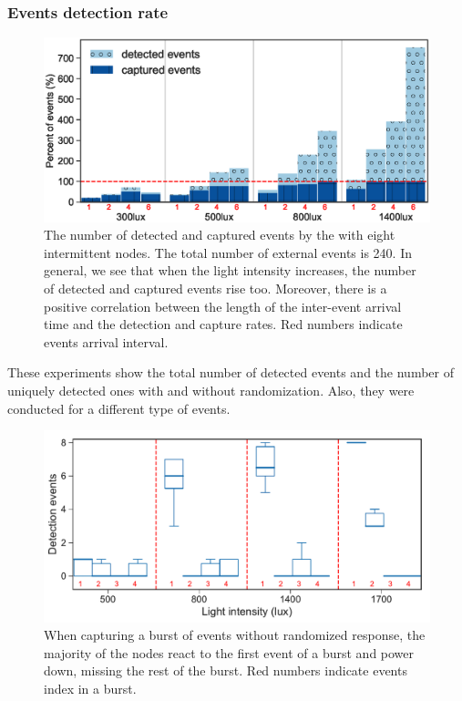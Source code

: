 \subsubsection{Events detection rate}
%
\begin{figure}[t]
		\centering
	    \includegraphics[width=\columnwidth]{figures/regular_events_capture_rate.eps}
		\caption{The number of detected and captured events by the \fullcim with eight intermittent nodes. The total number of external events is 240. In general, we see that when the light intensity increases, the number of detected and captured events rise too. Moreover, there is a positive correlation between the length of the inter-event arrival time and the detection and capture rates. Red numbers indicate events arrival interval.}
    	\label{fig:events_detection_rate}
\end{figure} 
These experiments show the total number of detected events and the number of uniquely detected ones with and without randomization. Also, they were conducted for a different type of events. 
%
\begin{figure}[t]
    \includegraphics[width=\columnwidth]{figures/events_burst_problem.pdf}
	\caption{When capturing a burst of events without randomized response, the majority of the nodes react to the first event of a burst and power down, missing the rest of the burst. Red numbers indicate events index in a burst.}
    \label{fig:events_burst_problem}
\end{figure}


